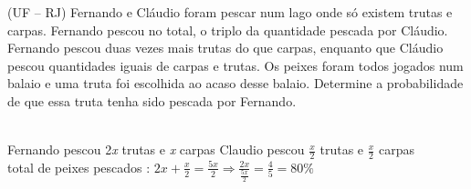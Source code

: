 \begin{ex}
(UF – RJ) Fernando e Cláudio foram pescar num lago onde só existem trutas e carpas. Fernando pescou no total, o triplo da quantidade pescada por Cláudio. Fernando pescou duas vezes mais trutas do que carpas, enquanto que Cláudio pescou quantidades iguais de carpas e trutas. Os peixes foram todos jogados num balaio e uma truta foi escolhida ao acaso desse balaio. Determine a probabilidade de que essa truta tenha sido pescada por Fernando.
  \begin{sol}
    \phantom{A} \\ 
    Fernando pescou 2\textit{x} trutas e \textit{x} carpas\hspace{0,3cm} Claudio pescou $\frac{x}{2}$ trutas e $\frac{x}{2}$ carpas\\
    total de peixes pescados : $2x+\frac{x}{2}=\frac{5x}{2} \Longrightarrow \frac{2x}{\frac{5x}{2}}=\frac{4}{5}=80\%$
  \end{sol}
\end{ex}